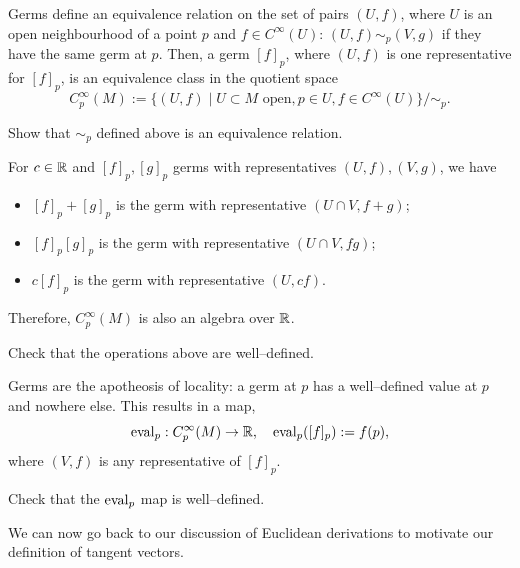 Germs define an equivalence relation on the set of pairs $(U, f)$, where $U$ is an open neighbourhood of a point $p$ and $f\in C^\infty(U)$: $(U, f) \sim_p (V, g)$ if they have the same germ at $p$. Then, a germ $[f]_p$, where $(U, f)$ is one representative for $[f]_p$, is an equivalence class in the quotient space
\begin{equation}
	C_p^\infty(M) := \{(U,f) \mid U\subset M \mbox{ open}, p\in U, f\in C^\infty(U)\}/\!\sim_p.
\end{equation}

\begin{exercise}
	Show that $\sim_p$ defined above is an equivalence relation.
\end{exercise}

For $c\in\mathbb{R}$ and $[f]_p, [g]_p$ germs with representatives $(U, f), (V, g)$, we have
\begin{itemize}
	\item $[f]_p + [g]_p$ is the germ with representative $(U\cap V, f+g)$;
	\item $[f]_p [g]_p$ is the germ with representative $(U\cap V, f g)$;
	\item $c[f]_p$ is the germ with representative $(U, cf)$.
\end{itemize}
Therefore, $C_p^\infty(M)$ is also an algebra over $\mathbb{R}$.

\begin{exercise}
	Check that the operations above are well--defined.
\end{exercise}

Germs are the apotheosis of locality: a germ at $p$ has a well--defined value at $p$ and nowhere else.
This results in a map,
\begin{equation}
	\operatorname{eval}_p: C_p^\infty(M) \to \mathbb{R}, \quad
	\operatorname{eval}_p([f]_p) := f(p),
\end{equation}
where $(V,f)$ is any representative of $[f]_p$.
\begin{exercise}
	Check that the $\operatorname{eval}_p$ map is well--defined.
\end{exercise}

We can now go back to our discussion of Euclidean derivations to motivate our definition of tangent vectors.

